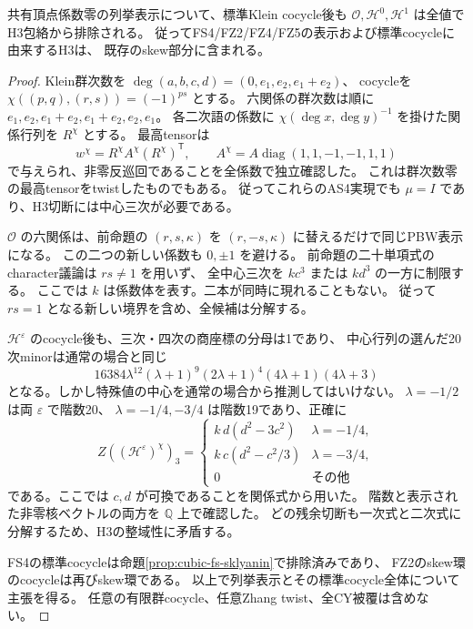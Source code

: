 \begin{corollary}\label{cor:cubic-fs-shared-zero-cocycles}
共有頂点係数零の列挙表示について、標準Klein cocycle後も
$\mathcal O,\mathcal H^0,\mathcal H^1$ は全値でH3包絡から排除される。
従ってFS4/FZ2/FZ4/FZ5の表示および標準cocycleに由来するH3は、
既存のskew部分に含まれる。
\end{corollary}
\begin{proof}
Klein群次数を $\deg(a,b,c,d)=(0,e_1,e_2,e_1+e_2)$、
cocycleを $\chi((p,q),(r,s))=(-1)^{ps}$ とする。
六関係の群次数は順に $e_1,e_2,e_1+e_2,e_1+e_2,e_2,e_1$。
各二次語の係数に $\chi(\deg x,\deg y)^{-1}$ を掛けた関係行列を $R^\chi$ とする。
最高tensorは
\[
 w^\chi=R^\chi A^\chi(R^\chi)^{\mathsf T},\qquad
 A^\chi=A\operatorname{diag}(1,1,-1,-1,1,1)
\]
で与えられ、非零反巡回であることを全係数で独立確認した。
これは群次数零の最高tensorをtwistしたものでもある。
従ってこれらのAS4実現でも $\mu=I$ であり、H3切断には中心三次が必要である。

$\mathcal O$ の六関係は、前命題の $(r,s,\kappa)$ を
$(r,-s,\kappa)$ に替えるだけで同じPBW表示になる。
この二つの新しい係数も $0,\pm1$ を避ける。
前命題の二十単項式のcharacter議論は $rs\ne1$ を用いず、
全中心三次を $kc^3$ または $kd^3$ の一方に制限する。
ここでは $k$ は係数体を表す。二本が同時に現れることもない。
従って $rs=1$ となる新しい境界を含め、全候補は分解する。

$\mathcal H^\varepsilon$ のcocycle後も、三次・四次の商座標の分母は1であり、
中心行列の選んだ20次minorは通常の場合と同じ
\[
 16384\lambda^{12}(\lambda+1)^9(2\lambda+1)^4(4\lambda+1)(4\lambda+3)
\]
となる。しかし特殊値の中心を通常の場合から推測してはいけない。
$\lambda=-1/2$ は両 $\varepsilon$ で階数20、
$\lambda=-1/4,-3/4$ は階数19であり、正確に
\[
 Z((\mathcal H^\varepsilon)^\chi)_3=
 \begin{cases}
 k\,d(d^2-3c^2)&\lambda=-1/4,\\
 k\,c(d^2-c^2/3)&\lambda=-3/4,\\
 0&\text{その他}
 \end{cases}
\]
である。ここでは $c,d$ が可換であることを関係式から用いた。
階数と表示された非零核ベクトルの両方を $\mathbb Q$ 上で確認した。
どの残余切断も一次式と二次式に分解するため、H3の整域性に矛盾する。

FS4の標準cocycleは命題\ref{prop:cubic-fs-sklyanin}で排除済みであり、
FZ2のskew環のcocycleは再びskew環である。
以上で列挙表示とその標準cocycle全体について主張を得る。
任意の有限群cocycle、任意Zhang twist、全CY被覆は含めない。
\end{proof}

